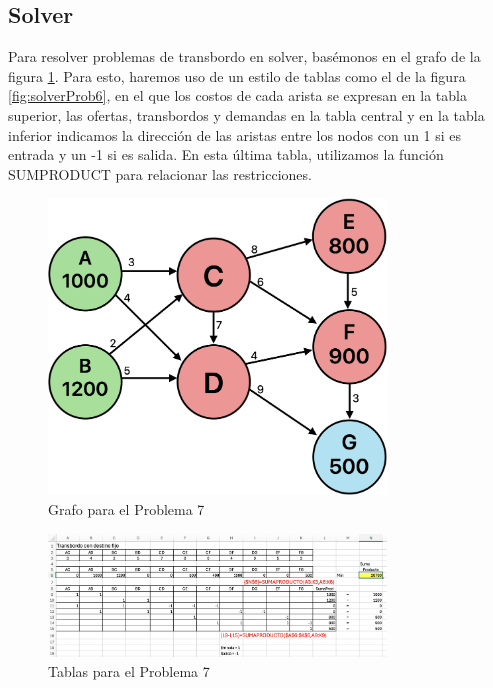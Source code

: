 \documentclass[12pt]{article}  %
\begin{document}
\subsection{Solver}
Para resolver problemas de transbordo en solver, basémonos en el grafo de la figura \ref{fig:grafoProb7}. Para esto, haremos uso de un estilo de tablas como el de la figura \ref{fig:solverProb6}, en el que los costos de cada arista se expresan en la tabla superior, las ofertas, transbordos y demandas en la tabla central y en la tabla inferior indicamos la dirección de las aristas entre los nodos con un 1 si es entrada y un -1 si es salida. En esta última tabla, utilizamos la función SUMPRODUCT para relacionar las restricciones.

\begin{figure}[H]
\centering
\caption{Grafo para el Problema 7}
\label{fig:grafoProb7}
\includegraphics[width=0.8\textwidth]{grafoProb7.png}
\end{figure}

\begin{figure}[H]
\centering
\caption{Tablas para el Problema 7}
\label{fig:tablasolverProb7}
\includegraphics[width=0.8\textwidth]{tablasolverProb7.png}
\end{figure}
\end{document}
